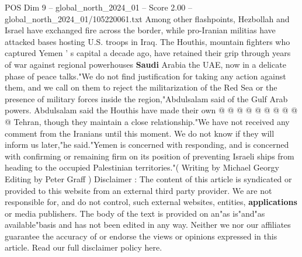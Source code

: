 \begin{textsample}{POS Dim 9 – global\_north\_2024\_01 – Score 2.00 – global\_north\_2024\_01/105220061.txt}
Among other flashpoints, Hezbollah and Israel have exchanged fire across the border, while pro-Iranian militias have attacked bases hosting U.S. troops in Iraq.
The Houthis, mountain fighters who captured Yemen ' s capital a decade ago, have retained their grip through years of war against regional powerhouses \textbf{Saudi} Arabia the UAE, now in a delicate phase of peace talks."We do not find justification for taking any action against them, and we call on them to reject the militarization of the Red Sea or the presence of military forces inside the region,"Abdulsalam said of the Gulf Arab powers.
Abdulsalam said the Houthis have made their own @ @ @ @ @ @ @ @ @ @ Tehran, though they maintain a close relationship."We have not received any comment from the Iranians until this moment.
We do not know if they will inform us later,"he said."Yemen is concerned with responding, and is concerned with confirming or remaining firm on its position of preventing Israeli ships from heading to the occupied Palestinian territories."( Writing by Michael Georgy Editing by Peter Graff ) Disclaimer : The content of this article is syndicated or provided to this website from an external third party provider.
We are not responsible for, and do not control, such external websites, entities, \textbf{applications} or media publishers.
The body of the text is provided on an"as is"and"as available"basis and has not been edited in any way.
Neither we nor our affiliates guarantee the accuracy of or endorse the views or opinions expressed in this article.
Read our full disclaimer policy here.

\end{textsample}
